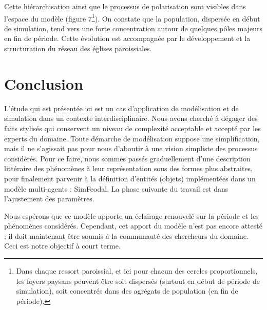 \documentclass[12pt, a4paper, oneside]{book}
\begin{document}
	Cette hiérarchisation ainsi que le processus de polarisation sont visibles dans l'espace du modèle (figure 7\footnote{
	Dans chaque ressort paroissial, et ici pour chacun des cercles proportionnels, les foyers paysans peuvent être soit dispersés (surtout en début de période de simulation), soit concentrés dans des agrégats de population (en fin de période).
}).
	On constate que la population, dispersée en début de simulation, tend vers une forte concentration autour de quelques pôles majeurs en fin de période.
	Cette évolution est accompagnée par le développement et la structuration du réseau des églises paroissiales.
	
	\section*{Conclusion}
	
	L'étude qui est présentée ici est un cas d'application de modélisation et de simulation dans un contexte interdisciplinaire.
	Nous avons cherché à dégager des faits stylisés qui conservent un niveau de complexité acceptable et accepté par les experts du domaine.
	Toute démarche de modélisation suppose une simplification, mais il ne s'agissait pas pour nous d'aboutir à une vision simpliste des processus considérés.
	Pour ce faire, nous sommes passés graduellement d'une description littéraire des phénomènes à leur représentation sous des formes plus abstraites, pour finalement parvenir à la définition d'entités (objets) implémentées dans un modèle multi-agents : SimFeodal.
	La phase suivante du travail est dans l'ajustement des paramètres.
	
	Nous espérons que ce modèle apporte un éclairage renouvelé sur la période et les phénomènes considérés.
	Cependant, cet apport du modèle n'est pas encore attesté ; il doit maintenant être soumis à la communauté des chercheurs du domaine.
	Ceci est notre objectif à court terme.
	
\end{document}
